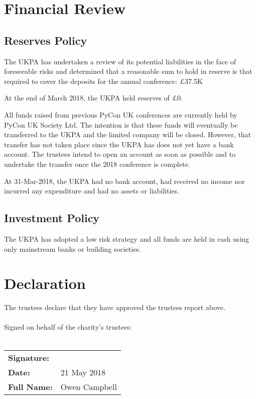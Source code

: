 \documentclass[11pt, final]{article}
\begin{document}
    \section{Financial Review}

        \subsection{Reserves Policy}
        The UKPA has undertaken a review of its potential liabilities in the face of foreseeable risks and determined that a reasonable sum to hold in reserve is that required to cover the deposits for the annual conference: \pounds37.5K

        At the end of March 2018, the UKPA held reserves of \pounds0.
        
        All funds raised from previous PyCon UK conferences are currently held by PyCon UK Society Ltd. The intention is that these funds will eventually be transferred to the UKPA and the limited company will be closed. However, that transfer has not taken place since the UKPA has does not yet have a bank account. The trustees intend to open an account as soon as possible and to undertake the transfer once the 2018 conference is complete.
        
        At 31-Mar-2018, the UKPA had no bank account, had received no income nor incurred any expenditure and had no assets or liabilities.
        
        \subsection{Investment Policy}
        The UKPA has adopted a low risk strategy and all funds are held in cash using only mainstream banks or building societies.

    \section{Declaration}
    The trustees declare that they have approved the trustees report above.\\
    \\
    Signed on behalf of the charity's trustees:\\
    \\
    \begin{tabular}{l l}
        \textbf{Signature:}\vspace{2cm}\\
        \textbf{Date:} & 21 May 2018\vspace{1cm}\\   
        \textbf{Full Name:} & Owen Campbell \\
    \end{tabular}
\end{document}
